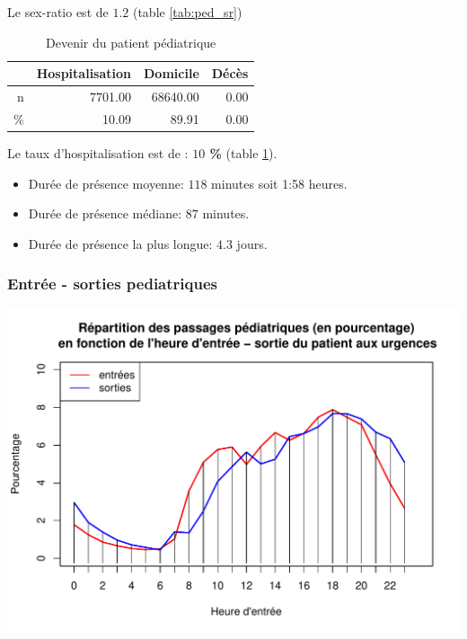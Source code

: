 \documentclass[12pt,english,french,twoside]{book}\usepackage[]{graphicx}\usepackage[]{color}
\makeatletter
\def\maxwidth{ %
  \ifdim\Gin@nat@width>\linewidth
    \linewidth
  \else
    \Gin@nat@width
  \fi
}
\newenvironment{knitrout}{}{} %
\makeatother
\begin{document}
Le sex-ratio est de $1.2$ (table \ref{tab:ped_sr})


\begin{table}[ht]
\centering
\begin{tabular}{rrrr}
  \hline
 & Hospitalisation & Domicile & Décès \\ 
  \hline
n & 7701.00 & 68640.00 & 0.00 \\ 
  \% & 10.09 & 89.91 & 0.00 \\ 
   \hline
\end{tabular}
\caption[Devenir du patient pédiatrique]{Devenir du patient pédiatrique} 
\label{tab:ped_hosp}
\end{table}


Le taux d'hospitalisation est de : \textbf{$10$ \%} (table \ref{tab:ped_hosp}).




\begin{itemize}
  \item Durée de présence moyenne: $118$ minutes soit 1:58 heures.
  \item Durée de présence médiane: $87$ minutes.
  \item Durée de présence la plus longue: $4.3$ jours.
\end{itemize}

\subsubsection*{Entrée - sorties pediatriques}

\begin{knitrout}
\color{fgcolor}
\includegraphics[width=\maxwidth]{figure/es_pediatriques-1} 

\end{knitrout}
\end{document}
